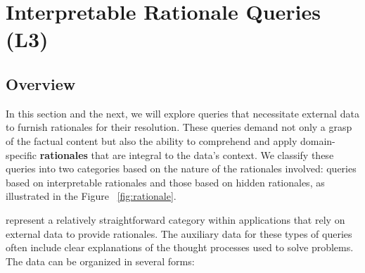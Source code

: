 \section{Interpretable Rationale Queries (L3)}

\subsection{Overview}
In this section and the next, we will explore queries that necessitate external data to furnish rationales for their resolution. These queries demand not only a grasp of the factual content but also the ability to comprehend and apply domain-specific \textbf{rationales} that are integral to the data's context. We classify these queries into two categories based on the nature of the rationales involved: queries based on interpretable rationales and those based on hidden rationales, as illustrated in the Figure ~\ref{fig:rationale}.

\MFUsentencecase{\thirdlevel} represent a relatively straightforward category within applications that rely on external data to provide rationales. The auxiliary data for these types of queries often include clear explanations of the thought processes used to solve problems. The data can be organized in several forms:


